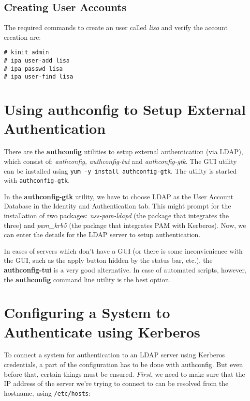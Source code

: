 \subsection{Creating User Accounts}
The required commands to create an user called \textit{lisa} and verify the account creation are:

\vspace{-15pt}
\begin{verbatim}
# kinit admin
# ipa user-add lisa
# ipa passwd lisa
# ipa user-find lisa
\end{verbatim}
\vspace{-10pt}	

\section{Using authconfig to Setup External Authentication}
There are the \textbf{authconfig} utilities to setup external authentication (via LDAP), which consist of: \textit{authconfig, authconfig-tui} and \textit{authconfig-gtk}. The GUI utility can be installed using \verb|yum -y install authconfig-gtk|. The utility is started with \verb|authconfig-gtk|. 

In the \textbf{authconfig-gtk} utility, we have to choose LDAP as the User Account Database in the Identity and Authentication tab. This might prompt for the installation of two packages: \textit{nss-pam-ldapd} (the package that integrates the three) and \textit{pam\_krb5} (the package that integrates PAM with Kerberos). Now, we can enter the details for the LDAP server to setup authentication. 

In cases of servers which don't have a GUI (or there is some inconvienience with the GUI, such as the apply button hidden by the status bar, etc.), the \textbf{authconfig-tui} is a very good alternative. In case of automated scripts, however, the \textbf{authconfig} command line utility is the best option. 

\section{Configuring a System to Authenticate using Kerberos}
To connect a system for authentication to an LDAP server using Kerberos credentials, a part of the configuration has to be done with authconfig. But even before that, certain things must be ensured. \textit{First}, we need to make sure that the IP address of the server we're trying to connect to can be resolved from the hostname, using \verb|/etc/hosts|:

